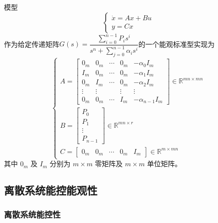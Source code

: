 \begin{theorem}[能观标准型实现]
    模型
    \begin{equation*}
        \begin{cases}
            \dot{x} = Ax + Bu \\
            y = Cx
        \end{cases}
    \end{equation*}
    作为给定传递矩阵$ G(s) = \dfrac{\sum\limits_{i=0}^{n-1} P_i s^i}{s^n + \sum\limits_{j=0}^{n-1} \alpha_i s^i}$的一个能观标准型实现为
    \begin{equation*}
        \begin{cases}
        A = \begin{bmatrix}
        0_m & 0_m & \cdots & 0_m & -\alpha_0 I_m \\
        I_m & 0_m & \cdots & 0_m & -\alpha_1 I_m \\
        0_m & I_m & \cdots & 0_m & -\alpha_2 I_m \\
        \vdots & \vdots & & \vdots & \vdots \\
        0_m & 0_m & \cdots & I_m & -\alpha_{n-1} I_m
        \end{bmatrix} \in \mathbb{R}^{mn \times mn}
        \\[20pt]
        B = \begin{bmatrix}
        P_0 \\
        P_1 \\
        \vdots \\
        P_{n-1}
        \end{bmatrix} \in \mathbb{R}^{mn \times r}
        \\[20pt]
        C = \begin{bmatrix}
        0_m & 0_m & \cdots & 0_m & I_m
        \end{bmatrix} \in \mathbb{R}^{m \times mn}
        \end{cases}
    \end{equation*}
    其中 $0_m$ 及 $I_m$ 分别为 $m \times m$ 零矩阵及 $m \times m$ 单位矩阵。
\end{theorem}

\subsection{离散系统能控能观性}

\subsubsection{离散系统能控性}


